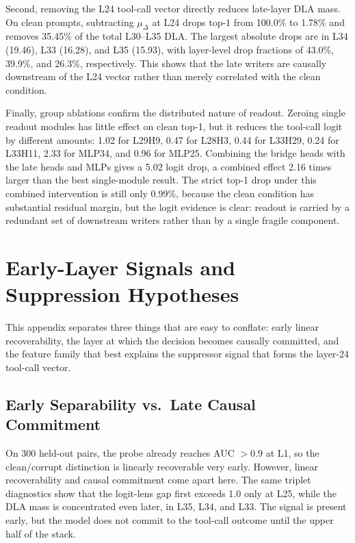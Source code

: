 Second, removing the L24 tool-call vector directly reduces late-layer DLA mass.
On clean prompts, subtracting $\mu_\Delta$ at L24 drops top-1 from 100.0\% to
1.78\%
and removes 35.45\% of the total L30--L35 DLA.  The largest absolute drops are
in L34 (19.46), L33 (16.28), and L35 (15.93), with layer-level drop fractions
of 43.0\%, 39.9\%, and 26.3\%, respectively.  This shows that the late writers
are causally downstream of the L24 vector rather than merely correlated with
the clean condition.

Finally, group ablations confirm the distributed nature of readout.  Zeroing
single readout modules has little effect on clean top-1, but it reduces the
tool-call logit by different amounts: 1.02 for L29H9, 0.47 for L28H3, 0.44
for L33H29, 0.24 for L33H11, 2.33 for MLP34, and 0.96 for MLP25.  Combining
the bridge heads with the late heads and MLPs gives a 5.02 logit drop,
a combined effect 2.16 times larger than the best single-module result.  The strict top-1 drop
under this combined intervention is still only 0.99\%, because the clean
condition has substantial residual margin, but the logit evidence is clear:
readout is carried by a redundant set of downstream writers rather than by a
single fragile component.

\section{Early-Layer Signals and Suppression Hypotheses}
\label{appendix:early-layer}
This appendix separates three things that are easy to conflate: early linear
recoverability, the layer at which the decision becomes causally committed,
and the feature family that best explains the suppressor signal that forms the
layer-24 tool-call vector.

\subsection{Early Separability vs.\ Late Causal Commitment}
On 300 held-out pairs, the probe already reaches AUC $> 0.9$ at L1, so the
clean/corrupt distinction is linearly recoverable very early. However, linear recoverability and causal commitment come apart here. The same triplet
diagnostics show that the logit-lens gap first exceeds 1.0 only at L25, while
the DLA mass is concentrated even later, in L35, L34, and L33. The signal is
present early, but the model does not commit to the tool-call outcome until
the upper half of the stack.

